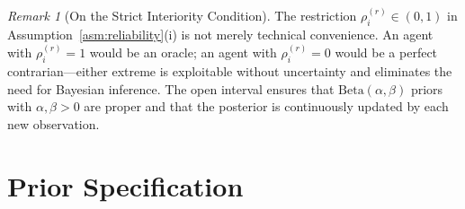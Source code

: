 \documentclass[12pt,openany]{book}
\numberwithin{equation}{chapter}
\theoremstyle{plain}
\theoremstyle{definition}
\theoremstyle{remark}
\newtheorem{remark}[theorem]{Remark}
\numberwithin{equation}{chapter}
\theoremstyle{plain}
\begin{document}
\begin{remark}[On the Strict Interiority Condition]
\label{rem:strict-interior}
The restriction $\rho_i^{(r)} \in (0,1)$ in
Assumption~\ref{asm:reliability}(i) is not merely
technical convenience.  An agent with $\rho_i^{(r)} = 1$
would be an oracle; an agent with $\rho_i^{(r)} = 0$ would
be a perfect contrarian—either extreme is exploitable
without uncertainty and eliminates the need for
Bayesian inference.  The open interval ensures that
$\mathrm{Beta}(\alpha, \beta)$ priors with $\alpha, \beta > 0$
are proper and that the posterior is continuously updated
by each new observation.
\end{remark}

\section{Prior Specification}
\end{document}
